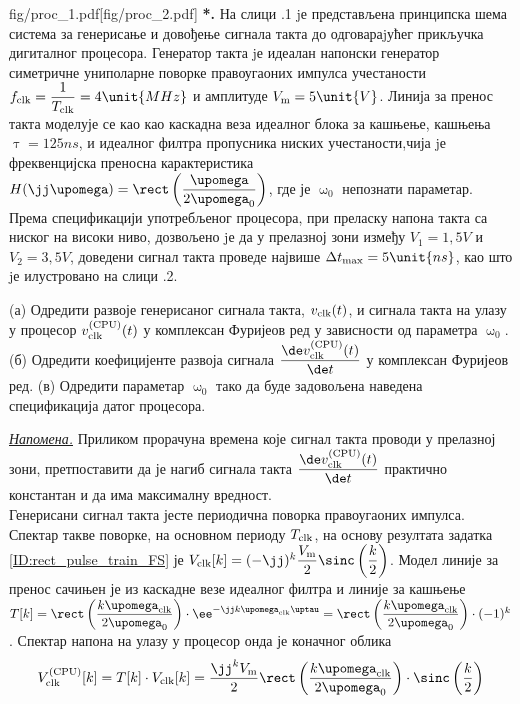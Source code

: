 \newpage
\begin{slikaDesno}{fig/proc_1.pdf}[fig/proc_2.pdf]
    \noindent
    \textbf{{\color{red}*}\PID.}
    На слици \ID.1 jе представљена принципска шема система за
    генерисање и довођење сигнала такта до одговараjућег прикључка
    дигиталног процесора. Генератор такта jе идеалан напонски
    генератор симетричне униполарне поворке правоугаоних импулса
    учестаности
    $f_{\rm clk} = \dfrac{1}{T_{\rm clk}} = 4\unit{MHz}$
    и амплитуде $V_{\rm m} = 5\unit{V}$. 
    Линија за пренос такта моделује се као као каскадна
    веза идеалног блока за кашњење, кашњења 
    $\uptau = 125\unit{ns}$, и идеалног филтра пропусника ниских учестаности,чија
    jе фреквенцијска преносна карактеристика 
    $H(\jj\upomega) = \rect\left( \dfrac{\upomega}{2\upomega_0} \right)$, где је 
    $\upomega_0$ непознати параметар. 
    Према спецификацији употребљеног процесора, при
    преласку напона такта са ниског на високи ниво, дозвољено jе
    да у прелазној зони између $V_1 = 1,5\unit{V}$ и $V_2 = 3,5\unit{V}$, доведени сигнал такта
    проведе највише 
    $\Delta t_{\rm max} = 5\unit{ns}$, као што jе илустровано на слици \ID.2. 
    \end{slikaDesno}

    (а) Одредити развоје генерисаног сигнала такта, $v_{\rm clk}(t)$, и сигнала такта
    на улазу у процесор $v_{\rm clk}^{\rm(CPU)}(t)$ у комплексан Фуријеов ред у зависности 
    од параметра $\upomega_0$.
    (б) Одредити коефицијенте развоја сигнала $\dfrac{\de v_{\rm clk}^{\rm (CPU)}(t)}{\de t}$ 
    у комплексан Фуријеов ред.  
    (в) Одредити параметар $\upomega_0$ тако да буде задовољена наведена спецификација датог 
    процесора. 

    \underline{\it Напомена.} Приликом прорачуна времена које сигнал такта проводи у 
    прелазној зони, претпоставити да је нагиб сигнала такта 
    $\dfrac{\de v_{\rm clk}^{\rm (CPU)}(t)}{\de t}$ практично константан и да има максималну 
    вредност. \\

    \RESENJE  Генерисани сигнал такта јесте периодична поворка правоугаоних импулса. 
    Спектар такве поворке, на основном периоду $T_{\rm clk}$, на основу резултата задатка 
    \ref{ID:rect_pulse_train_FS} је $V_{\rm clk}[k] = 
    (-\jj)^k \dfrac{V_{\rm m}}{2} \sinc \left(
    \dfrac{k}{2}
    \right) $.
    Модел линије за пренос сачињен је из каскадне везе идеалног филтра и линије за 
    кашњење $T[k] = \rect \left( \dfrac{k{\upomega_{\rm clk}}}{2\upomega_0} \right) 
    \cdot \ee^{-\jj k {\upomega_{\rm clk}\uptau}} = 
    \rect \left( \dfrac{k{\upomega_{\rm clk}}}{2\upomega_0} \right) 
    \cdot (-1)^k$. Спектар напона на улазу у процесор онда је коначног облика 
    \begin{equation}
        V_{\rm clk}^{\rm (CPU)}[k] 
        = T[k] \cdot V_{\rm clk}[k] 
        =  
        \dfrac{\jj^{k} V_{\rm m}}{2}
        \rect \left( \dfrac{k{\upomega_{\rm clk}}}{2\upomega_0} \right) 
        \cdot
        \sinc \left(
        \dfrac{k}{2} \right)
    \end{equation}


